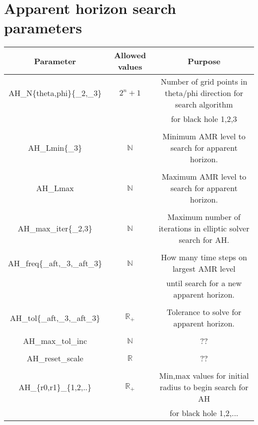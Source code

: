 \documentclass{article}
\begin{document}
\newpage
\section*{Apparent horizon search parameters}

\begin{table}[h]
   \centering 
   \begin{tabular}{ccc}
      Parameter  & Allowed values & Purpose \\
      \midrule\midrule
      AH\_N\{theta,phi\}\{\_2,\_3\} 
      &
      $2^n+1$
      &
      Number of grid points in theta/phi direction for search algorithm
      \\
      & & for black hole 1,2,3
      \\ \\
      AH\_Lmin\{\_3\} 
      &
      $\mathbb{N}$
      &
      Minimum AMR level to search for apparent horizon.
      \\ \\
      AH\_Lmax 
      &
      $\mathbb{N}$
      &
      Maximum AMR level to search for apparent horizon.
      \\ \\
      AH\_max\_iter\{\_2,3\} 
      &
      $\mathbb{N}$
      &
      Maximum number of iterations in elliptic solver search for AH.
      \\ \\
      AH\_freq\{\_aft,\_3,\_aft\_3\}
      &
      $\mathbb{N}$
      &
      How many time steps on largest AMR level 
      \\
      & & 
      until search for a new apparent horizon.
      \\ \\
      AH\_tol\{\_aft,\_3,\_aft\_3\}
      &
      $\mathbb{R}_+$
      &
      Tolerance to solve for apparent horizon.
      \\ \\
      AH\_max\_tol\_inc 
      &
      $\mathbb{N}$
      &
      ??
      \\ \\
      AH\_reset\_scale 
      &
      $\mathbb{R}$
      &
      ??
      \\ \\
      AH\_\{r0,r1\}\_\{1,2,..\}
      &
      $\mathbb{R}_+$
      &
      Min,max values for initial radius to begin search for AH
      \\\
      &
      &
      for black hole 1,2,...

\end{tabular}
\end{table}
\end{document}
